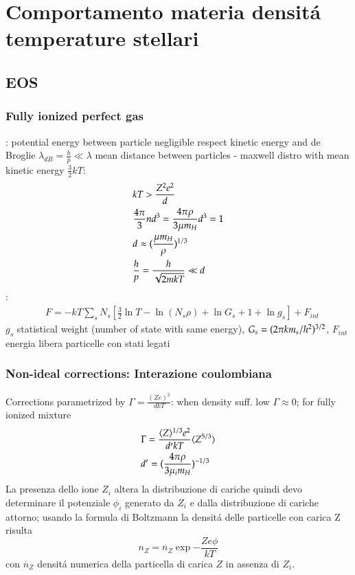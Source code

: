 \documentclass[main.tex]{subfiles}
\begin{document}
\chapter{Comportamento materia densit\'a temperature stellari}

\section{EOS}

\subsection{Fully ionized perfect gas}

: potential energy between particle negligible respect kinetic energy and de Broglie $\lambda_{dB}=\frac{h}{p}\ll\lambda$ mean distance between particles - maxwell distro with mean kinetic energy $\frac{3}{2}kT$:
\begin{align*}
&kT>\frac{Z^2e^2}{d}\\
&\frac{4\pi}{3}nd^3=\frac{4\pi\rho}{3\mu m_H}d^3=1\\
&d\approx(\frac{\mu m_H}{\rho})^{1/3}\\
&\frac{h}{p}=\frac{h}{\sqrt{2mkT}}\ll d
\end{align*}
:
\begin{align*}
&F=-kT\sum_sN_s[\frac{3}{2}\ln{T}-\ln{(N_s\rho)}+\ln{G_s}+1+\ln{g_s}]+F_{int}
\end{align*}
$g_s$ statistical weight (number of state with same energy), $G_s=(2\pi km_s/h^2)^{3/2}$, $F_{int}$ energia libera particelle con stati legati

\subsection{Non-ideal corrections: Interazione coulombiana}

Corrections parametrized by $\Gamma=\frac{(Ze)^2}{dkT}$: when density suff. low $\Gamma\approx0$; for fully ionized mixture
\begin{align*}
&\Gamma=\frac{\langle Z \rangle^{1/3}e^2}{d'kT}\langle Z^{5/3} \rangle\\
&d'=(\frac{4\pi\rho}{3\mu_im_H})^{-1/3}
\end{align*}
La presenza dello ione $Z_i$ altera la distribuzione di cariche quindi devo determinare il potenziale $\phi_i$ generato da $Z_i$ e dalla distribuzione di cariche attorno; usando la formula di Boltzmann la densit\'a delle particelle con carica Z risulta
\begin{equation}\label{eq:Bdistroelectricpot}
n_Z=\overline{n}_Z\exp{-\frac{Ze\phi}{kT}}
\end{equation}
con $\overline{n}_Z$ densit\'a numerica della particella di carica $Z$ in assenza di $Z_i$.
\end{document}
